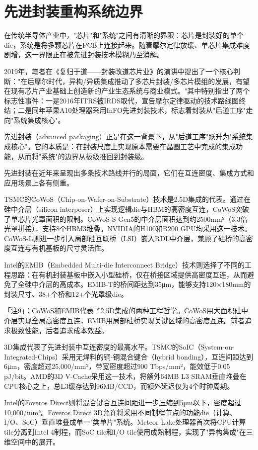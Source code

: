 \documentclass[11pt,a4paper]{article}
\begin{document}
\section{先进封装重构系统边界}

在传统半导体产业中，"芯片"和"系统"之间有清晰的界限：芯片是封装好的单个die，系统是将多颗芯片在PCB上连接起来。随着摩尔定律放缓、单芯片集成难度剧增，这一界限正在被先进封装技术模糊乃至消解。

2019年，笔者在《复归于道——封装改道芯片业》的演讲中提出了一个核心判断："在后摩尔时代，异构/异质集成推动了多芯片封装/多芯片模组的发展，有望在现有芯片产业基础上创造新的产业生态系统与商业模式。"其中特别指出了两个标志性事件：一是2016年ITRS被IRDS取代，宣告摩尔定律驱动的技术路线图终结；二是同年苹果A10处理器采用InFO先进封装技术，标志着封装从"后道工序"走向"系统集成核心"。

先进封装（advanced packaging）正是在这一背景下，从"后道工序"跃升为"系统集成核心"。它的本质是：在封装尺度上实现原本需要在晶圆工艺中完成的集成功能，从而将"系统"的边界从板级推回到封装级。

先进封装在近年来呈现出多条技术路线并行的局面，它们在互连密度、集成方式和应用场景上各有侧重。

TSMC的CoWoS（Chip-on-Wafer-on-Substrate）技术是2.5D集成的代表。通过在硅中介层（silicon interposer）上实现逻辑die与HBM的高密度互连，CoWoS突破了单芯片光罩面积的限制。CoWoS-S Gen5的中介层面积达到约2500mm²（3.3倍光罩拼接），支持8个HBM3堆叠。NVIDIA的H100和B200 GPU均采用这一技术。CoWoS-L则进一步引入局部硅互联桥（LSI）嵌入RDL中介层，兼顾了硅桥的高密度互连与有机基板的尺寸灵活性。

Intel的EMIB（Embedded Multi-die Interconnect Bridge）技术则选择了不同的工程思路：在有机封装基板中嵌入小型硅桥，仅在桥接区域提供高密度互连，从而避免了全硅中介层的高成本。EMIB-T的桥间距达到35μm，能够支持120×180mm的封装尺寸、38+个桥和12+个光罩级die。

「注9」：CoWoS和EMIB代表了2.5D集成的两种工程哲学。CoWoS用大面积硅中介层实现全局高密度互连，EMIB用局部硅桥实现关键区域的高密度互连。前者追求极致性能，后者追求成本效益。

3D集成代表了先进封装中互连密度的最高水平。TSMC的SoIC（System-on-Integrated-Chips）采用无焊料的铜-铜混合键合（hybrid bonding），互连间距达到6μm，密度超过25,000/mm²，带宽密度超过900 Tbps/mm²，能效低于0.05 pJ/bit。AMD的3D V-Cache采用这一技术，将额外64MB L3 SRAM垂直堆叠在CPU核心之上，总L3缓存达到96MB/CCD，而额外延迟仅为4个时钟周期。

Intel的Foveros Direct则将混合键合互连间距进一步压缩到5μm以下，密度超过10,000/mm²。Foveros Direct 3D允许将采用不同制程节点的功能die（计算、I/O、SoC）垂直堆叠成单一"类单片"系统。Meteor Lake处理器首次将CPU计算tile分离到Intel 4制程，而SoC tile和I/O tile使用成熟制程，实现了"异构集成"在三维空间中的展开。
\end{document}
